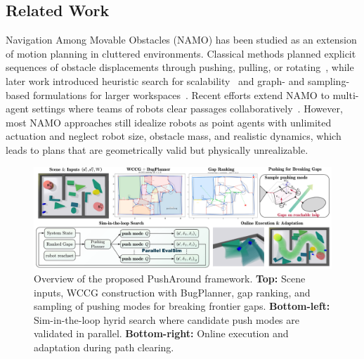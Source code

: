 \subsection{Related Work}\label{subsec:intro-related}

Navigation Among Movable Obstacles (NAMO) has been studied as an extension of
motion planning in cluttered environments. Classical methods planned explicit
sequences of obstacle displacements through pushing, pulling, or
rotating~\cite{stilman2005navigation,stilman2007manipulation}, while later work
introduced heuristic search for scalability~\cite{stilman2007manipulation} and
graph- and sampling-based formulations for larger workspaces~\cite{yao2024local}.
Recent efforts extend NAMO to multi-agent settings where teams of robots clear
passages collaboratively~\cite{tang2024collaborative,ren2025search}. However,
most NAMO approaches still idealize robots as point agents with unlimited
actuation and neglect robot size, obstacle mass, and realistic dynamics, which
leads to plans that are geometrically valid but physically unrealizable.


\begin{figure}[t!]
  \centering
  \includegraphics[width=0.95\linewidth]{figures/overall.png}
  \vspace{-0.1in}
\caption{Overview of the proposed PushAround framework.
\textbf{Top:} Scene inputs, WCCG construction with BugPlanner, gap ranking, and sampling of pushing
modes for breaking frontier gaps.
\textbf{Bottom-left:} Sim-in-the-loop hyrid search where candidate push modes are validated in parallel.
\textbf{Bottom-right:} Online execution and adaptation during path clearing.}

  \label{fig:overall}
  \vspace{-0.2in}
\end{figure}


